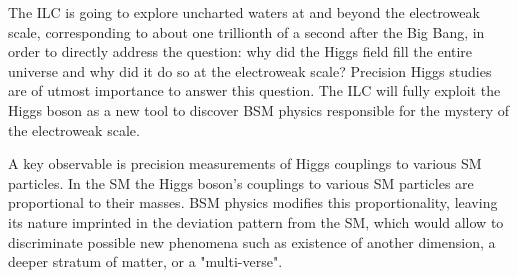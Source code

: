 The ILC is going to explore uncharted waters at and beyond the electroweak scale, corresponding to about one trillionth of a second after the Big Bang, in order to directly address the question: why did the Higgs field fill the entire universe and why did it do so at the electroweak scale? Precision Higgs studies are of utmost importance to answer this question. The ILC will fully exploit the Higgs boson as a new tool to discover BSM physics responsible for the mystery of the electroweak scale.

A key observable is precision measurements of Higgs couplings to various SM particles. In the SM the Higgs boson's couplings to various SM particles are proportional to their masses. BSM physics modifies this proportionality, leaving its nature imprinted in the deviation pattern from the SM, which would allow to discriminate possible new phenomena such as existence of another dimension, a deeper stratum of matter, or a "multi-verse".
%
%

